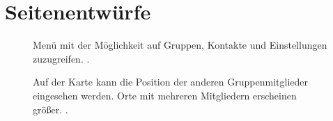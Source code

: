 \documentclass[parskip=full,11pt,twoside]{scrartcl}
\begin{document}
\pagebreak
\appendix

\section{Seitenentwürfe}


\begin{figure}[hb]
	\caption{\label{fig:menu}
		Menü mit der Möglichkeit auf Gruppen, Kontakte und Einstellungen zuzugreifen.
		 .
	}
\end{figure}

\begin{figure}[hb]
		\caption{\label{fig:map}
			Auf der Karte kann die Position der anderen Gruppenmitglieder eingesehen werden.
			Orte mit mehreren Mitgliedern erscheinen größer. 
			.
		}
\end{figure}
\end{document}
